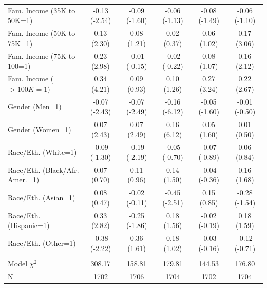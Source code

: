 \documentclass[11pt]{article}
\begin{document}
\begin{landscape}
\begin{table}[t]
\begin{tabular*}{\hsize}{@{\extracolsep{\fill}} l*{5}{c}}
Fam. Income (35K to 50K=1)   &-0.13 (-2.54)&-0.09 (-1.60)&-0.06 (-1.13)&-0.08 (-1.49)&-0.06 (-1.10)\\
Fam. Income (50K to 75K=1)   &0.13 (2.30)&0.08 (1.21)&0.02 (0.37)&0.06 (1.02)&0.17 (3.06)\\
Fam. Income (75K to 100=1)   &0.23 (2.98)&-0.01 (-0.15)&-0.02 (-0.22)&0.08 (1.07)&0.16 (2.12)\\
Fam. Income ($>100K=1$)         &0.34 (4.21)&0.09 (0.93)&0.10 (1.26)&0.27 (3.24)&0.22 (2.67)\\
Gender (Men=1)                &-0.07 (-2.43)&-0.07 (-2.49)&-0.16 (-6.12)&-0.05 (-1.60)&-0.01 (-0.50)\\
Gender (Women=1)              &0.07 (2.43)&0.07 (2.49)&0.16 (6.12)&0.05 (1.60)&0.01 (0.50)\\
Race/Eth. (White=1)           &-0.09 (-1.30)&-0.19 (-2.19)&-0.05 (-0.70)&-0.07 (-0.89)&0.06 (0.84)\\
Race/Eth. (Black/Afr. Amer.=1)&0.07 (0.70)&0.11 (0.96)&0.14 (1.50)&-0.04 (-0.36)&0.16 (1.68)\\
Race/Eth. (Asian=1)           &0.08 (0.47)&-0.02 (-0.11)&-0.45 (-2.51)&0.15 (0.85)&-0.28 (-1.54)\\
Race/Eth. (Hispanic=1)        &0.33 (2.82)&-0.25 (-1.86)&0.18 (1.56)&-0.02 (-0.19)&0.18 (1.59)\\
Race/Eth. (Other=1)           &-0.38 (-2.22)&0.36 (1.61)&0.18 (1.02)&-0.03 (-0.16)&-0.12 (-0.71)\\ \\
Model $\chi^{2}$                       &   308.17&   158.81&   179.81&   144.53&   176.80\\
N                             &     1702&     1706&     1704&     1702&     1704\\
\hline
\end{tabular*}
\label{tab2b}
\end{table}
\end{landscape}
\end{document}
